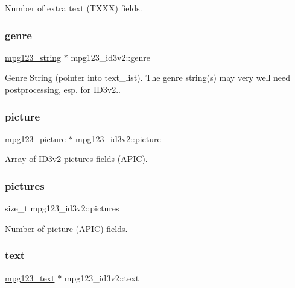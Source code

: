 Number of extra text (T\+X\+XX) fields. \mbox{\label{structmpg123__id3v2_a9e3c182c64c51f148075dc9e0b1c3c84}} 
\subsubsection{\texorpdfstring{genre}{genre}}
{\footnotesize\ttfamily \hyperlink{structmpg123__string}{mpg123\+\_\+string} $\ast$ mpg123\+\_\+id3v2\+::genre}

Genre String (pointer into text\+\_\+list). The genre string(s) may very well need postprocessing, esp. for I\+D3v2.. \mbox{\label{structmpg123__id3v2_a02b7ba6eb5e4172d262bde10e1f059bf}} 
\subsubsection{\texorpdfstring{picture}{picture}}
{\footnotesize\ttfamily \hyperlink{structmpg123__picture}{mpg123\+\_\+picture} $\ast$ mpg123\+\_\+id3v2\+::picture}

Array of I\+D3v2 pictures fields (A\+P\+IC). \mbox{\label{structmpg123__id3v2_ac13f50ac1a8d70b8be6580a71efc89b5}} 
\subsubsection{\texorpdfstring{pictures}{pictures}}
{\footnotesize\ttfamily size\+\_\+t mpg123\+\_\+id3v2\+::pictures}

Number of picture (A\+P\+IC) fields. \mbox{\label{structmpg123__id3v2_a1473b0e1751427d33a1560501003df38}} 
\subsubsection{\texorpdfstring{text}{text}}
{\footnotesize\ttfamily \hyperlink{structmpg123__text}{mpg123\+\_\+text} $\ast$ mpg123\+\_\+id3v2\+::text}

